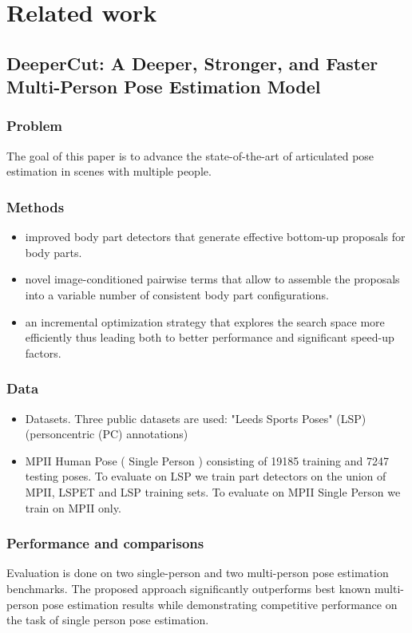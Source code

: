 \documentclass[runningheads,a4paper,11pt]{report}
\begin{document}
\chapter{Related work}

\section{DeeperCut\mbox{:} A Deeper, Stronger, and Faster Multi-Person Pose Estimation Model \cite{DBLP:journals/corr/InsafutdinovPAA16}}

\subsection{Problem}
The goal of this paper is to advance the state-of-the-art of articulated pose estimation in scenes with multiple people.

\subsection{Methods}
\begin{itemize}
  \item improved body part detectors that generate effective bottom-up proposals for body parts.
  \item novel image-conditioned pairwise terms that allow to assemble the proposals into a variable number of consistent body part configurations.
  \item an incremental optimization strategy that explores the search space more efficiently thus leading both to better performance and significant speed-up factors.
\end{itemize}

\subsection{Data}
\begin{itemize}
    \item Datasets. Three public datasets are used: \mbox{"}Leeds Sports Poses\mbox{"} (LSP) (personcentric (PC) annotations)
    \item MPII Human Pose ( Single Person )  consisting of 19185 training and 7247 testing poses. To evaluate on LSP we train part detectors on the union of MPII, LSPET and LSP training sets. To evaluate on MPII Single Person we train on MPII only.
\end{itemize}
\subsection{Performance and comparisons}
Evaluation is done on two single-person and two multi-person pose estimation benchmarks. The proposed approach significantly outperforms best known multi-person pose estimation results while demonstrating competitive performance on the task of single person pose estimation.
\end{document}

